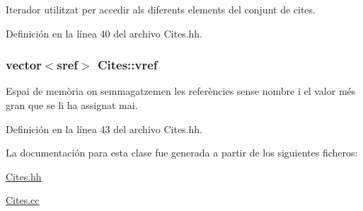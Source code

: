 Iterador utilitzat per accedir als diferents elements del conjunt de cites. 



Definición en la línea 40 del archivo Cites.\+hh.

\subsubsection[{\texorpdfstring{vref}{vref}}]{\setlength{\rightskip}{0pt plus 5cm}vector$<${\bf sref}$>$ Cites\+::vref\hspace{0.3cm}{\ttfamily [private]}}\hypertarget{class_cites_acf50e611e8f49533071e82fd9ff9b55a}{}\label{class_cites_acf50e611e8f49533071e82fd9ff9b55a}


Espai de memòria on s\textquotesingle{}emmagatzemen les referències sense nombre i el valor més gran que se li ha assignat mai. 



Definición en la línea 43 del archivo Cites.\+hh.



La documentación para esta clase fue generada a partir de los siguientes ficheros\+:\begin{DoxyCompactItemize}
\item 
\hyperlink{_cites_8hh}{Cites.\+hh}\item 
\hyperlink{_cites_8cc}{Cites.\+cc}\end{DoxyCompactItemize}

